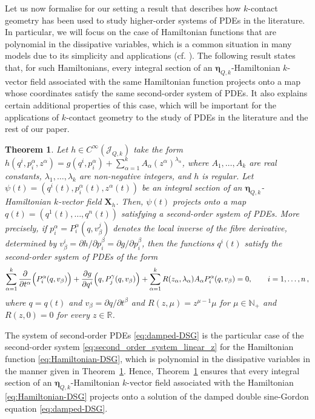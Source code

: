\documentclass[11pt,a4paper]{article}
\theoremstyle{plain} \newtheorem{theorem}{Theorem}[section] \newtheorem{proposition}[theorem]{Proposition} \newtheorem{corollary}[theorem]{Corollary} \newtheorem{lemma}[theorem]{Lemma} \theoremstyle{definition} \newtheorem{definition}[theorem]{Definition} \theoremstyle{remark} \newtheorem{remark}[theorem]{Remark} \newtheorem{example}[theorem]{Example} %
\begin{document}
Let us now formalise for our setting a result that describes how $k$-contact geometry has been used to study higher-order systems of PDEs in the literature. In particular, we will focus on the case of Hamiltonian functions that are polynomial in the dissipative variables, which is a common situation in many models due to its simplicity and applications (cf. \cite{Riv_22,Riv_23,RSS_24,GRR_22}). The following result states that, for such Hamiltonians, every integral section of an \(\bm\eta_{Q,k}\)-Hamiltonian   $k$-vector field associated with the same Hamiltonian function projects onto a map whose coordinates satisfy the same second-order system of PDEs. It also explains certain additional properties of this case, which will be important for the applications of $k$-contact geometry to the study of PDEs in the literature and the rest of our paper.

\begin{theorem}\label{thm:linear_z_same_second_order_system}
Let \(h\in C^\infty(\mathcal J_{Q,k})\) take the form \(h(q^i,p_i^\alpha,z^\alpha)=g(q^i,p_i^\alpha)+\sum_{\alpha=1}^kA_\alpha (z^\alpha)^{\lambda_\alpha}\), where \(A_1,\dots,A_k\) are real constants, $\lambda_1,\ldots,\lambda_k$ are non-negative integers, and \(h\) is regular. Let  \(\psi(t)=(q^i(t),p_i^\alpha(t),z^\alpha(t))\) be an integral section of an \(\bm\eta_{Q,k}\)-Hamiltonian \(k\)-vector field \({\bm X}_{h}\). Then, \(\psi(t)\) projects onto a map \(q(t)=(q^1(t),\dots,q^n(t))\) satisfying a second-order system of PDEs. More precisely, if \(p_i^\alpha=P_i^\alpha(q ,v_\beta^j)\) denotes the local inverse of the fibre derivative, determined by \(v_\beta^i=\partial h/\partial p_i^\beta=\partial g/\partial p_i^\beta\), then the functions \(q^i(t)\) satisfy the second-order system of PDEs of the form
\begin{equation}\label{eq:second_order_system_linear_z}
\sum_{\alpha=1}^k \frac{\partial}{\partial t^\alpha}\Bigl(P_i^\alpha(q,v_\beta)\Bigr)
+\frac{\partial g}{\partial q^i}\Bigl(q,P_j^\gamma(q,v_\beta)\Bigr)
+\sum_{\alpha=1}^k R(z_\alpha,\lambda_\alpha) A_\alpha P_i^\alpha(q,v_\beta)=0,\qquad i=1,\ldots,n\,,
\end{equation}
where \(q=q(t)\) and \(v_\beta =\partial q /\partial t^\beta\) and $R(z ,\mu)=z ^{\mu-1}\mu$  for $\mu\in \mathbb{N}_+$ and $R(z ,0)=0$ for every $z\in \mathbb{R}$.
\end{theorem}


The system of second-order PDEs \eqref{eq:damped-DSG} is the particular case of the second-order system \eqref{eq:second_order_system_linear_z} for the Hamiltonian function \eqref{eq:Hamiltonian-DSG}, which is polynomial in the dissipative variables in the manner given in Theorem~\ref{thm:linear_z_same_second_order_system}. Hence, Theorem~\ref{thm:linear_z_same_second_order_system} ensures that every integral section of an \(\bm\eta_{Q,k}\)-Hamiltonian  $k$-vector field associated with the Hamiltonian \eqref{eq:Hamiltonian-DSG} projects onto a solution of the damped double sine-Gordon equation \eqref{eq:damped-DSG}.
\end{document}
